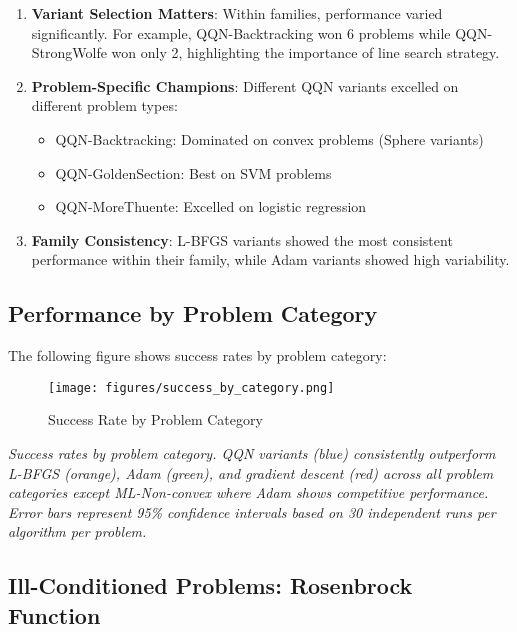 \begin{enumerate}
\def\labelenumi{\arabic{enumi}.}
\item
  \textbf{Variant Selection Matters}: Within families, performance varied significantly. For example, QQN-Backtracking won 6 problems while QQN-StrongWolfe won only 2, highlighting the importance of line search strategy.
\item
  \textbf{Problem-Specific Champions}: Different QQN variants excelled on different problem types:

  \begin{itemize}
  \tightlist
  \item
    QQN-Backtracking: Dominated on convex problems (Sphere variants)
  \item
    QQN-GoldenSection: Best on SVM problems
  \item
    QQN-MoreThuente: Excelled on logistic regression
  \end{itemize}
\item
  \textbf{Family Consistency}: L-BFGS variants showed the most consistent performance within their family, while Adam variants showed high variability.
\end{enumerate}

\hypertarget{performance-by-problem-category}{%
\subsection{Performance by Problem Category}\label{performance-by-problem-category}}

The following figure shows success rates by problem category:

\begin{figure}
\centering
\texttt{[image: figures/success\_by\_category.png]}
\caption{Success Rate by Problem Category}
\end{figure}

\emph{Success rates by problem category. QQN variants (blue) consistently outperform L-BFGS (orange), Adam (green), and gradient descent (red) across all problem categories except ML-Non-convex where Adam shows competitive performance. Error bars represent 95\% confidence intervals based on 30 independent runs per algorithm per problem.}

\hypertarget{ill-conditioned-problems-rosenbrock-function}{%
\subsection{Ill-Conditioned Problems: Rosenbrock Function}\label{ill-conditioned-problems-rosenbrock-function}}

